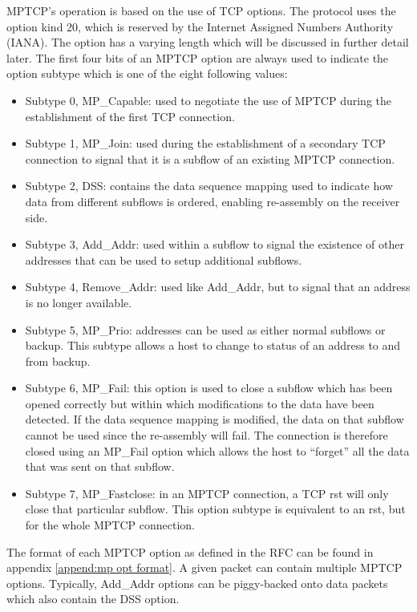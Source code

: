 MPTCP's operation is based on the use of TCP options. The protocol uses the option kind 20, which is reserved by the Internet Assigned Numbers Authority (IANA). The option has a varying length which will be discussed in further detail later. The first four bits of an MPTCP option are always used to indicate the option subtype which is one of the eight following values:

\begin{itemize}
\item Subtype 0, MP\_Capable: used to negotiate the use of MPTCP during the establishment of the first TCP connection.
\item Subtype 1, MP\_Join: used during the establishment of a secondary TCP connection to signal that it is a subflow of an existing MPTCP connection.
\item Subtype 2, DSS: contains the data sequence mapping used to indicate how data from different subflows is ordered, enabling re-assembly on the receiver side.
\item Subtype 3, Add\_Addr: used within a subflow to signal the existence of other addresses that can be used to setup additional subflows.
\item Subtype 4, Remove\_Addr: used like Add\_Addr, but to signal that an address is no longer available.
\item Subtype 5, MP\_Prio: addresses can be used as either normal subflows or backup. This subtype allows a host to change to status of an address to and from backup.
\item Subtype 6, MP\_Fail: this option is used to close a subflow which has been opened correctly but within which modifications to the data have been detected. If the data sequence mapping is modified, the data on that subflow cannot be used since the re-assembly will fail. The connection is therefore closed using an MP\_Fail option which allows the host to ``forget'' all the data that was sent on that subflow.
\item Subtype 7, MP\_Fastclose: in an MPTCP connection, a TCP rst will only close that particular subflow. This option subtype is equivalent to an rst, but for the whole MPTCP connection.
\end{itemize}

The format of each MPTCP option as defined in the RFC can be found in appendix \ref{append:mp opt format}. A given packet can contain multiple MPTCP options. Typically, Add\_Addr options can be piggy-backed onto data packets which also contain the DSS option.\\

